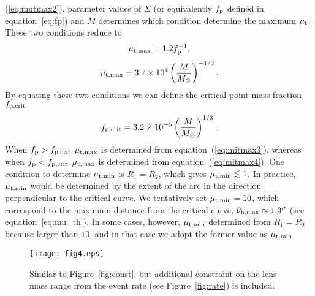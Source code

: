 \documentclass[showpacs,twocolumn,preprintnumbers,amsmath,amssymb,superscriptaddress,nofootinbib]{revtex4}
\begin{document}
(\ref{eq:mutmax2}), parameter values of $\Sigma$ (or equivalently
$f_{\rm p}$ defined in equation~\ref{eq:fp}) and $M$ determines which
condition determine the maximum $\mu_{\rm t}$. These two conditions
reduce to 
\begin{equation}
\mu_{\rm t, max}=1.2f_{\rm p}^{-1},
\label{eq:mitmax3}
\end{equation}
\begin{equation}
\mu_{\rm t, max}=3.7\times 10^4 \left(\frac{M}{M_\odot}\right)^{-1/3}.
\label{eq:mitmax4}
\end{equation}
By equating these two conditions we can define the critical point mass
fraction $f_{\rm p, crit}$
\begin{equation}
f_{\rm p, crit}=3.2\times 10^{-5}\left(\frac{M}{M_\odot}\right)^{1/3}.
\end{equation}
When $f_{\rm p}>f_{\rm p, crit}$ $\mu_{\rm t, max}$ is determined from
equation~(\ref{eq:mitmax3}), whereas when $f_{\rm p}<f_{\rm p, crit}$
$\mu_{\rm t, max}$ is determined from equation~(\ref{eq:mitmax4}).
One condition to determine $\mu_{\rm t,min}$ is $R_1=R_2$, which gives
$\mu_{\rm t,min}\lesssim 1$. In practice, $\mu_{\rm t,min}$ would be
determined by the extent of the arc in the direction perpendicular to
the critical curve. We tentatively set $\mu_{\rm t,min}=10$, which
correspond to the maximum distance from the critical curve,
$\theta_{\rm h,max}\approx 1.3''$ (see equation~\ref{eq:mu_th}). In
some cases, however, $\mu_{\rm t,min}$ determined from $R_1=R_2$
because larger than $10$, and in that case we adopt the former value
as $\mu_{\rm t,min}$. 

\begin{figure}[t]
\begin{center}
\texttt{[image: fig4.eps]}
\end{center}
\caption{Similar to Figure~\ref{fig:const}, but additional constraint
  on the lens mass range from the event rate (see
  Figure~\ref{fig:rate}) is included. }
\label{fig:const_rate}
\end{figure}
\end{document}
